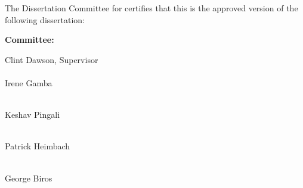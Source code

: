 \thispagestyle{empty} %
\makeatletter
\begin{center}
The Dissertation Committee for \@author\space certifies that this is the approved version of the following dissertation:

\vspace{1cm}
\textbf{
\large
\@title
}
\end{center}

\vspace{2cm}
\begin{flushright}
\textbf{Committee:}\hspace{.6\textwidth} \vspace{1cm}

Clint Dawson, Supervisor \\ \ \\
\vspace{1em}
Irene Gamba\\ \ \\
\vspace{1em}

Keshav Pingali\\ \ \\
\vspace{1em}

Patrick Heimbach\\ \ \\
\vspace{1em}

George Biros\\
\vspace{1em}

\end{flushright}

